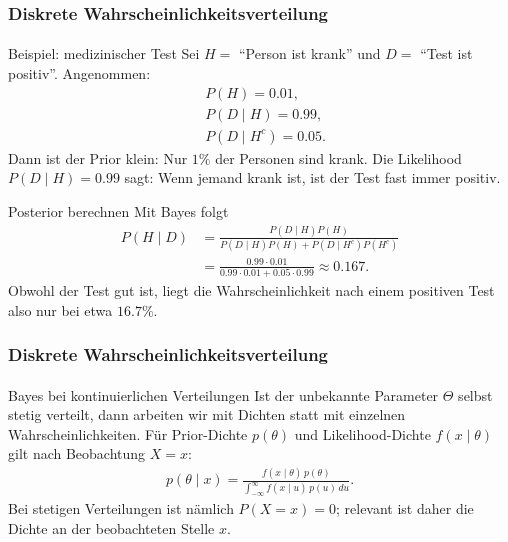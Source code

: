 \documentclass{beamer}
\begin{document}
\begin{frame}[shrink=5]
    \frametitle{Diskrete Wahrscheinlichkeitsverteilung}
\framesubtitle{}

\begin{block}{Beispiel: medizinischer Test}
Sei $H=$ ``Person ist krank'' und $D=$ ``Test ist positiv''.
Angenommen:
\begin{align*}
&P(H)=0.01, \\
&P(D \mid H)=0.99, \\
&P(D \mid H^c)=0.05.
\end{align*}
Dann ist der Prior klein: Nur $1\%$ der Personen sind krank. Die Likelihood $P(D \mid H)=0.99$ sagt: Wenn jemand krank ist, ist der Test fast immer positiv.
\end{block}

\begin{block}{Posterior berechnen}
Mit Bayes folgt
\begin{align*}
P(H \mid D)
&= \frac{P(D \mid H)P(H)}{P(D \mid H)P(H) + P(D \mid H^c)P(H^c)} \\
&= \frac{0.99 \cdot 0.01}{0.99 \cdot 0.01 + 0.05 \cdot 0.99}
\approx 0.167.
\end{align*}
Obwohl der Test gut ist, liegt die Wahrscheinlichkeit nach einem positiven Test also nur bei etwa $16.7\%$.
\end{block}

 \end{frame}


\begin{frame}[shrink=5]
    \frametitle{Diskrete Wahrscheinlichkeitsverteilung}
\framesubtitle{}

\begin{block}{Bayes bei kontinuierlichen Verteilungen}
Ist der unbekannte Parameter $\Theta$ selbst stetig verteilt, dann arbeiten wir mit Dichten statt mit einzelnen Wahrscheinlichkeiten.
Für Prior-Dichte $p(\theta)$ und Likelihood-Dichte $f(x \mid \theta)$ gilt nach Beobachtung $X=x$:
\begin{align*}
p(\theta \mid x)
= \frac{f(x \mid \theta)\, p(\theta)}{\int_{-\infty}^{\infty} f(x \mid u)\, p(u)\, du}.
\end{align*}
Bei stetigen Verteilungen ist nämlich $P(X=x)=0$; relevant ist daher die Dichte an der beobachteten Stelle $x$.
\end{block}

 \end{frame}
\end{document}
